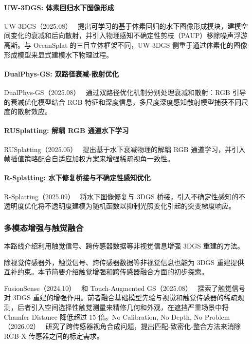 \paragraph{UW-3DGS: 体素回归水下图像形成}

UW-3DGS（2025.08）~\cite{2508_06169} 提出可学习的基于体素回归的水下图像形成模块，建模空间变化的衰减和后向散射，并引入物理感知不确定性剪枝（PAUP）移除噪声浮游高斯。与 OceanSplat 的三目立体框架不同，UW-3DGS 侧重于通过体素化的图像形成模型来显式建模水下物理过程。

\paragraph{DualPhys-GS: 双路径衰减-散射优化}

DualPhys-GS（2025.08）~\cite{2508_09610} 通过双路径优化机制分别处理衰减和散射：RGB 引导的衰减优化模型结合 RGB 特征和深度信息，多尺度深度感知散射模型捕获不同尺度的散射效应。

\paragraph{RUSplatting: 解耦 RGB 通道水下学习}

RUSplatting（2025.05）~\cite{2505_15737} 提出基于水下衰减物理的解耦 RGB 通道学习，并引入帧插值策略配合自适应加权方案来增强稀疏视角一致性。

\paragraph{R-Splatting: 水下修复桥接与不确定性感知优化}

R-Splatting（2025.09）~\cite{2509_17789} 将水下图像修复与 3DGS 桥接，引入不确定性感知的不透明度优化将不透明度建模为随机函数以抑制光照变化引起的突变梯度响应。

\subsubsection{多模态增强与触觉融合}

本路线介绍利用触觉信号、跨传感器数据等非视觉信息增强 3DGS 重建的方法。

除视觉传感器外，触觉信号、跨传感器数据等非视觉信息也能为 3DGS 重建提供互补约束。本节简要介绍触觉增强和跨传感器融合方面的初步探索。

FusionSense（2024.10）~\cite{2410_08282} 和 Touch-Augmented GS（2025.08）~\cite{2508_07717} 探索了触觉信号对 3DGS 重建的增强作用。前者融合基础模型先验与视觉和触觉传感器的稀疏观测，后者引入空间选择性触觉测量来精修几何和外观，在遮挡严重场景中将 Chamfer Distance 降低超过 15 倍。No Calibration, No Depth, No Problem（2026.02）~\cite{2602_23559} 研究了跨传感器视角合成问题，提出匹配-致密化-整合方法来消除 RGB-X 传感器之间的标定需求。

